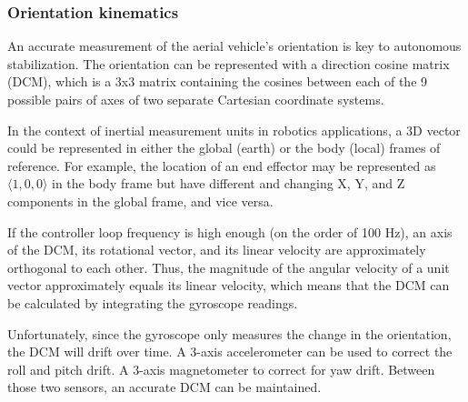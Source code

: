 \documentclass[12pt,letterpaper]{article}
\begin{document}
\subsubsection*{Orientation kinematics}

An accurate measurement of the aerial vehicle's orientation is key to
autonomous stabilization. The orientation can be represented with a direction
cosine matrix (DCM), which is a 3x3 matrix containing the cosines between each
of the 9 possible pairs of axes of two separate Cartesian coordinate systems.

In the context of inertial measurement units in robotics applications, a 3D
vector could be represented in either the global (earth) or the body (local)
frames of reference. For example, the location of an end effector may be
represented as $\langle1, 0, 0\rangle$ in the body frame but have different and changing
X, Y, and Z components in the global frame, and vice versa.

If the controller loop frequency is high enough (on the order of 100 Hz), an
axis of the DCM, its rotational vector, and its linear velocity are
approximately orthogonal to each other. Thus, the magnitude of the angular
velocity of a unit vector approximately equals its linear velocity, which means
that the DCM can be calculated by integrating the gyroscope readings.

Unfortunately, since the gyroscope only measures the change in the orientation,
the DCM will drift over time. A 3-axis accelerometer can be 
used to correct the roll and pitch drift. A 3-axis magnetometer to correct for 
yaw drift. Between those two sensors, an accurate DCM can be maintained.



\end{document}
